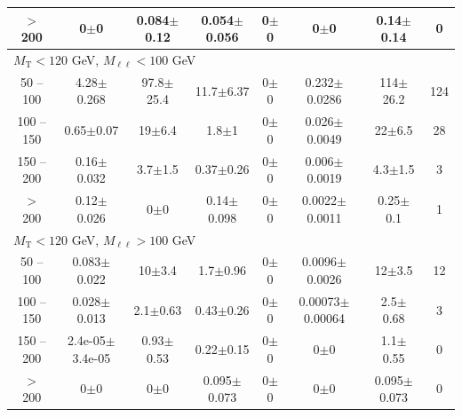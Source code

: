 \begin{landscape}
\begin{table}
\begin{center}
\begin{tabular}{| c | c c c c c c  c | }
$>$ 200&0$\pm$0&0.084$\pm$0.12&0.054$\pm$0.056&0$\pm$0&0$\pm$0&0.14$\pm$0.14&0\\
\hline\hline
\multicolumn{8}{l}{$M_{\text{T}} < 120$ GeV, $M_{\ell\ell} < 100$ GeV}\\\hline\hline
50 -- 100&4.28$\pm$0.268&97.8$\pm$25.4&11.7$\pm$6.37&0$\pm$0&0.232$\pm$0.0286&114$\pm$26.2&124\\
100 -- 150&0.65$\pm$0.07&19$\pm$6.4&1.8$\pm$1&0$\pm$0&0.026$\pm$0.0049&22$\pm$6.5&28\\
150 -- 200&0.16$\pm$0.032&3.7$\pm$1.5&0.37$\pm$0.26&0$\pm$0&0.006$\pm$0.0019&4.3$\pm$1.5&3\\
$>$ 200&0.12$\pm$0.026&0$\pm$0&0.14$\pm$0.098&0$\pm$0&0.0022$\pm$0.0011&0.25$\pm$0.1&1\\
\hline\hline
\multicolumn{8}{l}{$M_{\text{T}} < 120$ GeV, $M_{\ell\ell} > 100$ GeV}\\\hline\hline
50 -- 100&0.083$\pm$0.022&10$\pm$3.4&1.7$\pm$0.96&0$\pm$0&0.0096$\pm$0.0026&12$\pm$3.5&12\\
100 -- 150&0.028$\pm$0.013&2.1$\pm$0.63&0.43$\pm$0.26&0$\pm$0&0.00073$\pm$0.00064&2.5$\pm$0.68&3\\
150 -- 200&2.4e-05$\pm$3.4e-05&0.93$\pm$0.53&0.22$\pm$0.15&0$\pm$0&0$\pm$0&1.1$\pm$0.55&0\\
$>$ 200&0$\pm$0&0$\pm$0&0.095$\pm$0.073&0$\pm$0&0$\pm$0&0.095$\pm$0.073&0\\
\hline\hline
\end{tabular}
\end{center}
\end{table}
\end{landscape}
